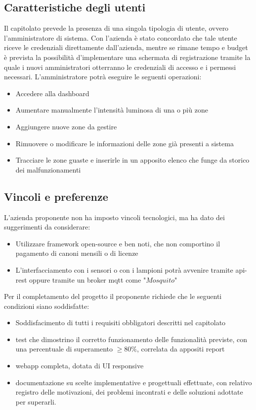 \documentclass[12pt]{article}
\begin{document}
\subsection{Caratteristiche degli utenti}
Il capitolato prevede la presenza di una singola tipologia di utente, ovvero l'amministratore di sistema. Con l'azienda è stato concordato che tale utente riceve le credenziali direttamente dall'azienda, mentre se rimane tempo e budget è prevista la possibilità d'implementare una schermata di registrazione tramite la quale i nuovi amministratori otterranno le credenziali di accesso e i permessi necessari.
L'amministratore potrà eseguire le seguenti operazioni:
\begin{itemize}
	\item Accedere alla dashboard
	\item Aumentare manualmente l'intensità luminosa di una o più zone
	\item Aggiungere nuove zone da gestire
	\item Rimuovere o modificare le informazioni delle zone già presenti a sistema
	\item Tracciare le zone guaste e inserirle in un apposito elenco che funge da storico dei malfunzionamenti
\end{itemize}

\subsection{Vincoli e preferenze}
L'azienda proponente non ha imposto vincoli tecnologici, ma ha dato dei suggerimenti da considerare:
\begin{itemize}
	\item Utilizzare framework open-source e ben noti, che non comportino il pagamento di canoni mensili o di licenze
	\item L'interfacciamento con i sensori o con i lampioni potrà avvenire tramite api-rest oppure tramite un broker mqtt come "$Mosquito$"
\end{itemize}

Per il completamento del progetto il proponente richiede che le seguenti condizioni siano soddisfatte:
\begin{itemize}
	\item Soddisfacimento di tutti i requisiti obbligatori descritti nel capitolato
	\item test che dimostrino il corretto funzionamento delle funzionalità previste, con una percentuale di superamento \begin{math}\geq 80\% \end{math}, correlata da appositi report
	\item  webapp completa, dotata di UI responsive
	\item documentazione su scelte implementative e progettuali effettuate, con relativo registro delle motivazioni, dei problemi incontrati e delle soluzioni adottate per superarli.
\end{itemize}
\end{document}
